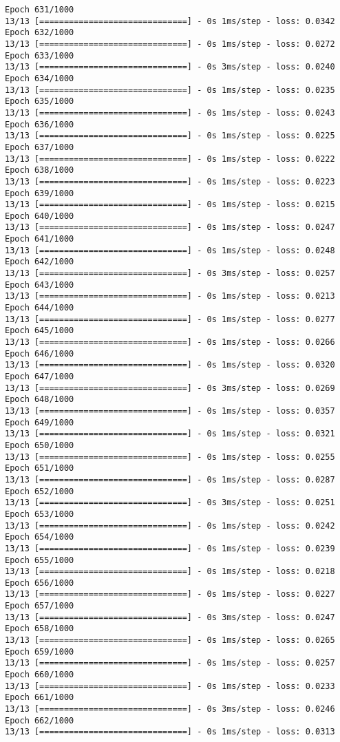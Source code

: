 \documentclass[11pt]{article}
\begin{document}
\begin{Verbatim}[commandchars=\\\{\}]
Epoch 631/1000
13/13 [==============================] - 0s 1ms/step - loss: 0.0342
Epoch 632/1000
13/13 [==============================] - 0s 1ms/step - loss: 0.0272
Epoch 633/1000
13/13 [==============================] - 0s 3ms/step - loss: 0.0240
Epoch 634/1000
13/13 [==============================] - 0s 1ms/step - loss: 0.0235
Epoch 635/1000
13/13 [==============================] - 0s 1ms/step - loss: 0.0243
Epoch 636/1000
13/13 [==============================] - 0s 1ms/step - loss: 0.0225
Epoch 637/1000
13/13 [==============================] - 0s 1ms/step - loss: 0.0222
Epoch 638/1000
13/13 [==============================] - 0s 1ms/step - loss: 0.0223
Epoch 639/1000
13/13 [==============================] - 0s 1ms/step - loss: 0.0215
Epoch 640/1000
13/13 [==============================] - 0s 1ms/step - loss: 0.0247
Epoch 641/1000
13/13 [==============================] - 0s 1ms/step - loss: 0.0248
Epoch 642/1000
13/13 [==============================] - 0s 3ms/step - loss: 0.0257
Epoch 643/1000
13/13 [==============================] - 0s 1ms/step - loss: 0.0213
Epoch 644/1000
13/13 [==============================] - 0s 1ms/step - loss: 0.0277
Epoch 645/1000
13/13 [==============================] - 0s 1ms/step - loss: 0.0266
Epoch 646/1000
13/13 [==============================] - 0s 1ms/step - loss: 0.0320
Epoch 647/1000
13/13 [==============================] - 0s 3ms/step - loss: 0.0269
Epoch 648/1000
13/13 [==============================] - 0s 1ms/step - loss: 0.0357
Epoch 649/1000
13/13 [==============================] - 0s 1ms/step - loss: 0.0321
Epoch 650/1000
13/13 [==============================] - 0s 1ms/step - loss: 0.0255
Epoch 651/1000
13/13 [==============================] - 0s 1ms/step - loss: 0.0287
Epoch 652/1000
13/13 [==============================] - 0s 3ms/step - loss: 0.0251
Epoch 653/1000
13/13 [==============================] - 0s 1ms/step - loss: 0.0242
Epoch 654/1000
13/13 [==============================] - 0s 1ms/step - loss: 0.0239
Epoch 655/1000
13/13 [==============================] - 0s 1ms/step - loss: 0.0218
Epoch 656/1000
13/13 [==============================] - 0s 1ms/step - loss: 0.0227
Epoch 657/1000
13/13 [==============================] - 0s 3ms/step - loss: 0.0247
Epoch 658/1000
13/13 [==============================] - 0s 1ms/step - loss: 0.0265
Epoch 659/1000
13/13 [==============================] - 0s 1ms/step - loss: 0.0257
Epoch 660/1000
13/13 [==============================] - 0s 1ms/step - loss: 0.0233
Epoch 661/1000
13/13 [==============================] - 0s 3ms/step - loss: 0.0246
Epoch 662/1000
13/13 [==============================] - 0s 1ms/step - loss: 0.0313

\end{Verbatim}
\end{document}

